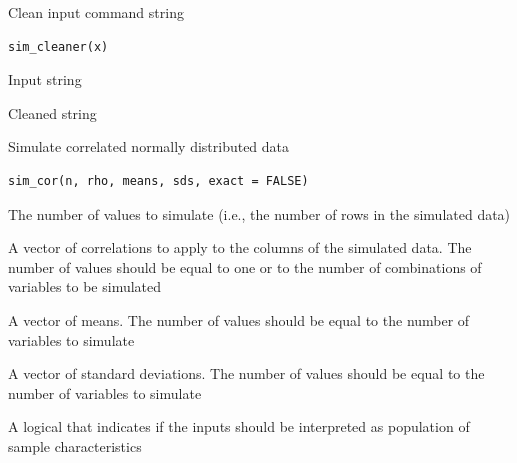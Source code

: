 \documentclass[a4paper]{book}
\begin{document}
%
\begin{Description}
Clean input command string
\end{Description}
%
\begin{Usage}
\begin{verbatim}
sim_cleaner(x)
\end{verbatim}
\end{Usage}
%
\begin{Arguments}
\begin{ldescription}
\item[\code{x}] Input string
\end{ldescription}
\end{Arguments}
%
\begin{Value}
Cleaned string
\end{Value}
%
\begin{Description}
Simulate correlated normally distributed data
\end{Description}
%
\begin{Usage}
\begin{verbatim}
sim_cor(n, rho, means, sds, exact = FALSE)
\end{verbatim}
\end{Usage}
%
\begin{Arguments}
\begin{ldescription}
\item[\code{n}] The number of values to simulate (i.e., the number of rows in the simulated data)

\item[\code{rho}] A vector of correlations to apply to the columns of the simulated data. The number of values should be equal to one or to the number of combinations of variables to be simulated

\item[\code{means}] A vector of means. The number of values should be equal to the number of variables to simulate

\item[\code{sds}] A vector of standard deviations. The number of values should be equal to the number of variables to simulate

\item[\code{exact}] A logical that indicates if the inputs should be interpreted as population of sample characteristics
\end{ldescription}
\end{Arguments}
\end{document}

